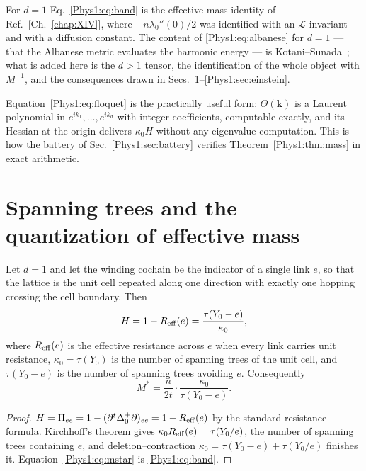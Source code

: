 For $d=1$ Eq.~\eqref{Phys1:eq:band} is the effective-mass identity of
Ref.~[Ch.~\ref{chap:XIV}], where $-n\lambda_0''(0)/2$ was identified with an
$\mathcal L$-invariant and with a diffusion constant. The content of
\eqref{Phys1:eq:albanese} for $d=1$ --- that the Albanese metric evaluates the harmonic energy ---
is Kotani--Sunada~\cite{KS1,KS3}; what is added here is the $d>1$ tensor, the identification
of the whole object with $M^{-1}$, and the consequences drawn in
Secs.~\ref{Phys1:sec:trees}--\ref{Phys1:sec:einstein}.

\begin{remark}
Equation~\eqref{Phys1:eq:floquet} is the practically useful form: $\Theta(\bm k)$ is a Laurent
polynomial in $e^{ik_1},\dots,e^{ik_d}$ with integer coefficients, computable exactly, and
its Hessian at the origin delivers $\kappa_0H$ without any eigenvalue computation. This is
how the battery of Sec.~\ref{Phys1:sec:battery} verifies Theorem~\ref{Phys1:thm:mass} in exact
arithmetic.
\end{remark}

\section{Spanning trees and the quantization of effective mass}\label{Phys1:sec:trees}

\begin{theorem}\label{Phys1:thm:trees}
Let $d=1$ and let the winding cochain be the indicator of a single link $e$, so that the
lattice is the unit cell repeated along one direction with exactly one hopping crossing the
cell boundary. Then
\begin{equation}\label{Phys1:eq:trees}
H=1-R_{\mathrm{eff}}(e)=\frac{\tau(Y_0-e)}{\kappa_0},
\end{equation}
where $R_{\mathrm{eff}}(e)$ is the effective resistance across $e$ when every link carries unit
resistance, $\kappa_0=\tau(Y_0)$ is the number of spanning trees of the unit cell, and
$\tau(Y_0-e)$ is the number of spanning trees avoiding $e$. Consequently
\begin{equation}\label{Phys1:eq:mstar}
M^{*}=\frac{n}{2t}\cdot\frac{\kappa_0}{\tau(Y_0-e)} .
\end{equation}
\end{theorem}

\begin{proof}
$H=\Pi_{ee}=1-(\partial^{t}\Delta_0^{+}\partial)_{ee}=1-R_{\mathrm{eff}}(e)$ by the standard
resistance formula. Kirchhoff's theorem gives $\kappa_0R_{\mathrm{eff}}(e)=\tau(Y_0/e)$, the number of
spanning trees containing $e$, and deletion--contraction
$\kappa_0=\tau(Y_0-e)+\tau(Y_0/e)$ finishes it. Equation~\eqref{Phys1:eq:mstar} is
\eqref{Phys1:eq:band}.
\end{proof}

